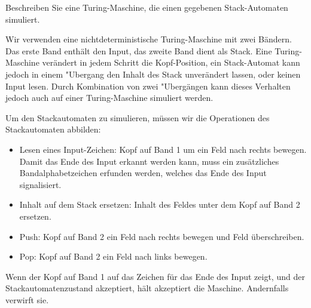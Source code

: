 Beschreiben Sie eine Turing-Maschine, die einen gegebenen Stack-Automaten simuliert.


\begin{loesung}
Wir verwenden eine nichtdeterministische Turing-Maschine mit zwei Bändern.
Das erste Band
enthält den Input, das zweite Band dient als Stack. Eine Turing-Maschine
verändert in jedem Schritt die Kopf-Position, ein Stack-Automat kann
jedoch in einem "Ubergang den Inhalt des Stack unverändert lassen,
oder keinen Input lesen. Durch Kombination von zwei "Ubergängen
kann dieses Verhalten jedoch auch auf einer Turing-Maschine simuliert
werden.

Um den Stackautomaten zu simulieren, müssen wir die Operationen des
Stackautomaten abbilden:
\begin{itemize}
\item Lesen eines Input-Zeichen: Kopf auf Band 1 um ein Feld nach
rechts bewegen. Damit das Ende des Input erkannt werden kann, muss ein
zusätzliches Bandalphabetzeichen erfunden werden, welches das Ende
des Input signalisiert.
\item Inhalt auf dem Stack ersetzen: Inhalt des Feldes unter dem Kopf
auf Band 2 ersetzen.
\item Push: Kopf auf Band 2 ein Feld nach rechts bewegen und Feld überschreiben.
\item Pop: Kopf auf Band 2 ein Feld nach links bewegen.
\end{itemize}
Wenn der Kopf auf Band 1 auf das Zeichen für das Ende des Input zeigt,
und der Stackautomatenzustand akzeptiert, hält akzeptiert die Maschine.
Andernfalls verwirft sie.
\end{loesung}
